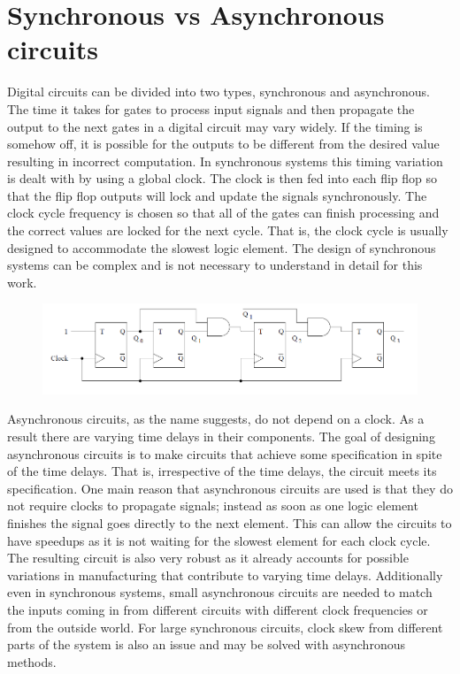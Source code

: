 \documentclass[12pt]{report}
\begin{document}
\section{Synchronous vs Asynchronous circuits}
Digital circuits can be divided into two types, synchronous and asynchronous.  The time it takes for gates to process input signals and then propagate the output to the next gates in a digital circuit may vary widely.  If the timing is somehow off, it is possible for the outputs to be different from the desired value resulting in incorrect computation. In synchronous systems this timing variation is dealt with by using a global clock.  The clock is then fed into each flip flop so that the flip flop outputs will lock and update the signals synchronously. The clock cycle frequency is chosen so that all of the gates can finish processing and the correct values are locked for the next cycle. That is, the clock cycle is usually designed to accommodate the slowest logic element. The design of synchronous systems can be complex and is not necessary to understand in detail for this work. \\
\begin{figure}
\includegraphics[width=\textwidth]{syncex}
\end{figure}

Asynchronous circuits, as the name suggests, do not depend on a clock. As a result there are varying time delays in their components. The goal of designing asynchronous circuits is to make circuits that achieve some specification in spite of the time delays. That is, irrespective of the time delays, the circuit meets its specification. One main reason that asynchronous circuits are used is that they do not require clocks to propagate signals; instead as soon as one logic element finishes the signal goes directly to the next element.  This can allow the circuits to have speedups as it is not waiting for the slowest element for each clock cycle.  The resulting circuit is also very robust as it already accounts for possible variations in manufacturing that contribute to varying time delays.  Additionally even in synchronous systems, small asynchronous circuits are needed to match the inputs coming in from different circuits with different clock frequencies or from the outside world.  For large synchronous circuits, clock skew from different parts of the system is also an issue and may be solved with asynchronous methods. \\ %
\end{document}
